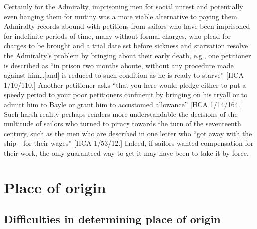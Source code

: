 Certainly for the Admiralty, imprisoning men for social unrest and potentially even hanging them for mutiny was a more viable alternative to paying them. Admiralty records abound with petitions from sailors who have been imprisoned for indefinite periods of time, many without formal charges, who plead for charges to be brought and a trial date set before sickness and starvation resolve the Admiralty’s problem by bringing about their early death, e.g., one petitioner is described as “in prison two months aboute, without any procedure made against him…[and] is reduced to such condition as he is ready to starve” [HCA 1/10/110.] Another petitioner asks “that you here would pledge either to put a speedy period to your poor petitioners confinemt by bringing on his tryall or to admitt him to Bayle or grant him to accustomed allowance” [HCA 1/14/164.] Such harsh reality perhaps renders more understandable the decisions of the multitude of sailors who turned to piracy towards the turn of the seventeenth century, such as the men who are described in one letter who “got away with the ship - for their wages” [HCA 1/53/12.] Indeed, if sailors wanted compensation for their work, the only guaranteed way to get it may have been to take it by force. 

\section{{Place} {of} {origin} }%


\subsection{{Difficulties} {in} {determining} {place} {of} {origin}}%


